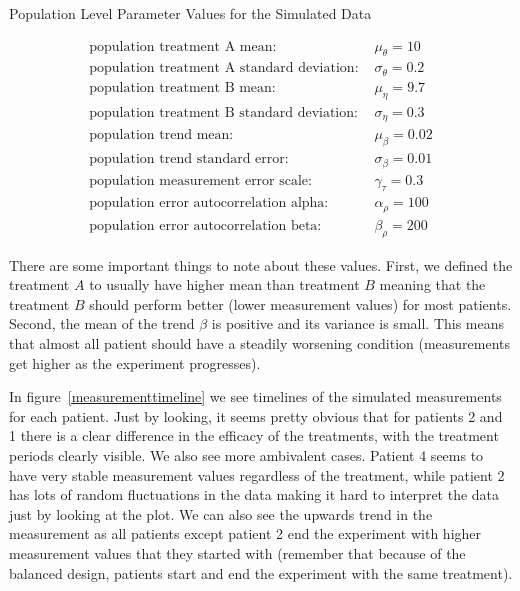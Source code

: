 \documentclass[12pt,a4paper,leqno]{report}
\theoremstyle{plain}
\theoremstyle{definition}
\theoremstyle{remark}
\begin{document}
\begin{table}[H]
    \caption{Population Level Parameter Values for the Simulated Data}\label{populationparameters}
    \begin{align}\label{}
        \text{population treatment A mean: } & \mu_{\theta} = 10 \nonumber \\
        \text{population treatment A standard deviation: } & \sigma_{\theta} = 0.2 \nonumber \\
        \text{population treatment B mean: } & \mu_{\eta} = 9.7 \nonumber \\
        \text{population treatment B standard deviation: } & \sigma_{\eta} = 0.3 \nonumber \\
        \text{population trend mean: } & \mu_{\beta} = 0.02 \nonumber \\
        \text{population trend standard error: } & \sigma_{\beta} = 0.01 \nonumber \\
        \text{population measurement error scale: } & \gamma_{\tau} = 0.3 \nonumber \\
        \text{population error autocorrelation alpha: } & \alpha_{\rho} = 100 \nonumber \\
        \text{population error autocorrelation beta: } & \beta_{\rho} = 200 \nonumber
    \end{align}
\end{table}

There are some important things to note about these values. First, we defined the
treatment \(A\) to usually have higher mean than treatment \(B\) meaning that the
treatment \(B\) should perform better (lower measurement values) for most patients.
Second, the mean of the trend \(\beta \) is positive and its variance is small. This means
that almost all patient should have a steadily worsening condition (measurements get
higher as the experiment progresses).

In figure\ \ref{measurementtimeline} we see timelines of the simulated measurements for each patient. Just by looking, it seems
pretty obvious that for patients 2 and 1 there is a clear difference in the efficacy of the
treatments, with the treatment periods clearly visible. We also see more ambivalent
cases. Patient 4 seems to have very stable measurement values regardless of the
treatment, while patient 2 has lots of random fluctuations in the data making it hard to
interpret the data just by looking at the plot. We can also see the upwards trend in the
measurement as all patients except patient 2 end the experiment with higher measurement values
that they started with (remember that because of the balanced design, patients start and
end the experiment with the same treatment).
\end{document}
